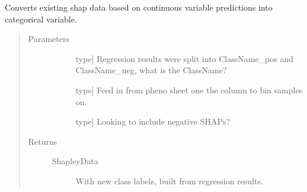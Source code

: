 \documentclass[letterpaper,10pt,english]{sphinxmanual}
\begin{document}
\begin{fulllineitems}
\begin{fulllineitems}
\begin{quote}
\begin{description}
\begin{description}
\end{description}

\end{description}\end{quote}

\end{fulllineitems}


\begin{fulllineitems}
\label{\detokenize{index:methylnet.interpretation_classes.ShapleyDataExplorer.return_binned_shapley_data}}
Converts existing shap data based on continuous variable predictions into categorical variable.
\begin{quote}\begin{description}
\item[{Parameters}] \leavevmode\begin{description}
\item[{}] \leavevmode{[}type{]}
Regression results were split into ClassName\_pos and ClassName\_neg, what is the ClassName?

\item[{}] \leavevmode{[}type{]}
Feed in from pheno sheet one the column to bin samples on.

\item[{}] \leavevmode{[}type{]}
Looking to include negative SHAPs?

\end{description}

\item[{Returns}] \leavevmode\begin{description}
\item[{ShapleyData}] \leavevmode
With new class labels, built from regression results.

\end{description}

\end{description}\end{quote}

\end{fulllineitems}


\end{fulllineitems}
\end{document}
